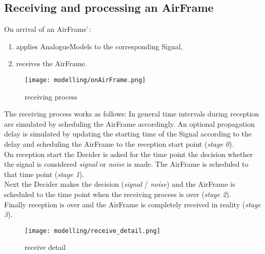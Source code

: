 \subsection{Receiving and processing an AirFrame}

On arrival of an AirFrame \h{\bp}:
\begin{enumerate}
	
	\item applies AnalogueModels to the corresponding
Signal,
	\item receives the AirFrame.
\end{enumerate}

\begin{figure}[H]
 \centering
 \texttt{[image: modelling/onAirFrame.png]}
 \caption{receiving process}
 \label{fig: receiving process}
\end{figure}


The receiving process works as follows: In general time intervals during
reception are simulated by scheduling the AirFrame accordingly.
An optional propagation delay is simulated by updating the starting time of the
Signal according to the delay and scheduling the AirFrame to
the reception start point (\textit{stage 0}).\\

On reception start the Decider is asked for the time point the
decision whether the signal is considered \textit{signal} or \textit{noise} is
made. The AirFrame is scheduled to that time point (\textit{stage 1}).\\

Next the Decider makes the decision (\textit{signal} / \textit{noise}) and the
AirFrame is scheduled to the time point when the receiving process is over
(\textit{stage 2}).\\

Finally reception is over and the AirFrame is completely received in reality
(\textit{stage 3}).

\begin{figure}[H]
 \centering
 \texttt{[image: modelling/receive\_detail.png]}
 \caption{receive detail}
 \label{fig: receive detail}
\end{figure}

